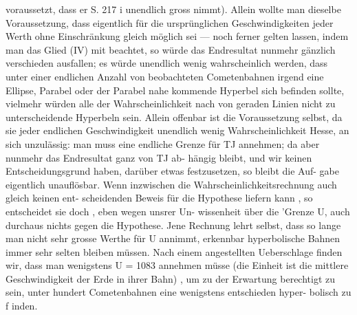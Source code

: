 \documentclass[12pt,a4paper]{article}
\begin{document}
voraussetzt, dass er S. 217 i unendlich gross nimmt). Allein wollte man dieselbe Voraussetzung, dass\newline
eigentlich für die ursprünglichen Geschwindigkeiten jeder Werth ohne Einschränkung gleich möglich\newline
sei --- noch ferner gelten lassen, indem man das Glied (IV) mit beachtet, so würde das Endresultat\newline
nunmehr gänzlich verschieden ausfallen; es würde unendlich wenig wahrscheinlich werden, dass unter\newline
einer endlichen Anzahl von beobachteten Cometenbahnen irgend eine Ellipse, Parabel oder der Parabel\newline
nahe kommende Hyperbel sich befinden sollte, vielmehr würden alle der Wahrscheinlichkeit nach von\newline
geraden Linien nicht zu unterscheidende Hyperbeln sein. Allein offenbar ist die Voraussetzung selbst,\newline
da sie jeder endlichen Geschwindigkeit unendlich wenig Wahrscheinlichkeit Hesse, an sich unzulässig:\newline
man muss eine endliche Grenze für TJ annehmen; da aber nunmehr das Endresultat ganz von TJ ab-\newline
hängig bleibt, und wir keinen Entscheidungsgrund haben, darüber etwas festzusetzen, so bleibt die Auf-\newline
gabe eigentlich unauflösbar. Wenn inzwischen die Wahrscheinlichkeitsrechnung auch gleich keinen ent-\newline
scheidenden Beweis für die Hypothese liefern kann , so entscheidet sie doch , eben wegen unsrer Un-\newline
wissenheit über die 'Grenze U, auch durchaus nichts gegen die Hypothese. Jene Rechnung lehrt selbst,\newline
dass so lange man nicht sehr grosse Werthe für U annimmt, erkennbar hyperbolische Bahnen immer\newline
sehr selten bleiben müssen. Nach einem angestellten Ueberschlage finden wir, dass man wenigstens\newline
U = 1083 annehmen müsse (die Einheit ist die mittlere Geschwindigkeit der Erde in ihrer Bahn) , um\newline
zu der Erwartung berechtigt zu sein, unter hundert Cometenbahnen eine wenigstens entschieden hyper-\newline
bolisch zu f inden.\newline
\end{document}
